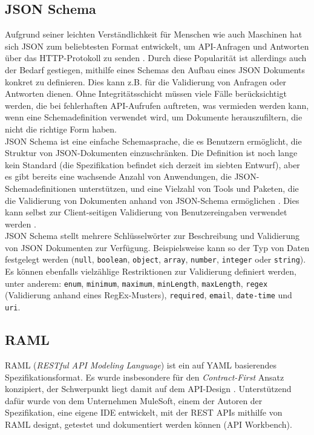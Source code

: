 \subsection{JSON Schema}

Aufgrund seiner leichten Verständlichkeit für Menschen wie auch Maschinen hat sich JSON zum beliebtesten Format entwickelt, um API-Anfragen und Antworten über das HTTP-Protokoll zu senden \parencite[263]{pezoa2016foundations}. Durch diese Popularität ist allerdings auch der Bedarf gestiegen, mithilfe eines Schemas den Aufbau eines JSON Dokuments konkret zu definieren. Dies kann z.B. für die Validierung von Anfragen oder Antworten dienen. Ohne Integritätsschicht müssen viele Fälle berücksichtigt werden, die bei fehlerhaften API-Aufrufen auftreten, was vermieden werden kann, wenn eine Schemadefinition verwendet wird, um Dokumente herauszufiltern, die nicht die richtige Form haben. \\

JSON Schema ist eine einfache Schemasprache, die es Benutzern ermöglicht, die Struktur von JSON-Dokumenten einzuschränken. Die Definition ist noch lange kein Standard (die Spezifikation befindet sich derzeit im siebten Entwurf), aber es gibt bereits eine wachsende Anzahl von Anwendungen, die JSON-Schemadefinitionen unterstützen, und eine Vielzahl von Tools und Paketen, die die Validierung von Dokumenten anhand von JSON-Schema ermöglichen \parencite[264]{pezoa2016foundations}. Dies kann selbst zur Client-seitigen Validierung von Benutzereingaben verwendet werden \parencite{sturgeon2018validation}. \\

JSON Schema stellt mehrere Schlüsselwörter zur Beschreibung und Validierung von JSON Dokumenten zur Verfügung. Beispielsweise kann so der Typ von Daten festgelegt werden (\lstinline|null|, \lstinline|boolean|, \lstinline|object|, \lstinline|array|, \lstinline|number|, \lstinline|integer| oder \lstinline|string|). Es können ebenfalls vielzählige Restriktionen zur Validierung definiert werden, unter anderem: \lstinline|enum|, \lstinline|minimum|, \lstinline|maximum|, \lstinline|minLength|, \lstinline|maxLength|, \lstinline|regex| (Validierung anhand eines RegEx-Musters), \lstinline|required|, \lstinline|email|, \lstinline|date-time| und \lstinline|uri|. \\

\subsection{RAML}
RAML (\emph{RESTful API Modeling Language}) ist ein auf YAML basierendes Spezifikationsformat. Es wurde insbesondere für den \emph{Contract-First} Ansatz konzipiert, der Schwerpunkt liegt damit auf dem API-Design \parencites[277]{spichale2017api}[165]{tilkov2015rest}. Unterstützend dafür wurde von dem Unternehmen MuleSoft, einem der Autoren der Spezifikation, eine eigene IDE entwickelt, mit der REST APIs mithilfe von RAML designt, getestet und dokumentiert werden können (API Workbench). \\

